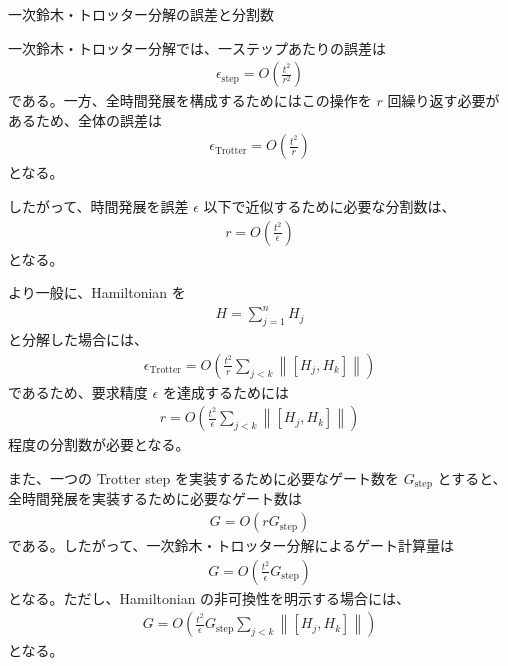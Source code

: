 \documentclass[a4paper,10.5pt]{article}
\numberwithin{equation}{section}
\begin{document}
\begin{resultbox}{一次鈴木・トロッター分解の誤差と分割数}

一次鈴木・トロッター分解では、一ステップあたりの誤差は
\begin{align}
    \epsilon_{\mathrm{step}}
    =
    O\left(
        \frac{t^2}{r^2}
    \right)
\end{align}
である。一方、全時間発展を構成するためにはこの操作を $r$ 回繰り返す必要があるため、全体の誤差は
\begin{align}
    \boxed{
        \epsilon_{\mathrm{Trotter}}
        =
        O\left(
            \frac{t^2}{r}
        \right)
    }
\end{align}
となる。

したがって、時間発展を誤差 $\epsilon$ 以下で近似するために必要な分割数は、
\begin{align}
    \boxed{
        r
        =
        O\left(
            \frac{t^2}{\epsilon}
        \right)
    }
\end{align}
となる。

より一般に、Hamiltonian を
\begin{align}
    H=\sum_{j=1}^{n}H_j
\end{align}
と分解した場合には、
\begin{align}
    \epsilon_{\mathrm{Trotter}}
    =
    O\left(
        \frac{t^2}{r}
        \sum_{j<k}
        \left\|
            [H_j,H_k]
        \right\|
    \right)
\end{align}
であるため、要求精度 $\epsilon$ を達成するためには
\begin{align}
    r
    =
    O\left(
        \frac{t^2}{\epsilon}
        \sum_{j<k}
        \left\|
            [H_j,H_k]
        \right\|
    \right)
\end{align}
程度の分割数が必要となる。

また、一つの Trotter step を実装するために必要なゲート数を $G_{\mathrm{step}}$ とすると、全時間発展を実装するために必要なゲート数は
\begin{align}
    G
    =
    O\left(
        rG_{\mathrm{step}}
    \right)
\end{align}
である。したがって、一次鈴木・トロッター分解によるゲート計算量は
\begin{align}
    G
    =
    O\left(
        \frac{t^2}{\epsilon}
        G_{\mathrm{step}}
    \right)
\end{align}
となる。ただし、Hamiltonian の非可換性を明示する場合には、
\begin{align}
    G
    =
    O\left(
        \frac{t^2}{\epsilon}
        G_{\mathrm{step}}
        \sum_{j<k}
        \left\|
            [H_j,H_k]
        \right\|
    \right)
\end{align}
となる。
\end{resultbox}
\end{document}
